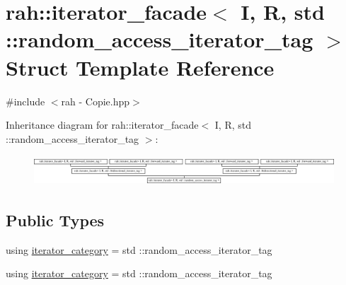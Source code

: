 \hypertarget{structrah_1_1iterator__facade_3_01_i_00_01_r_00_01std_01_1_1random__access__iterator__tag_01_4}{}\section{rah\+::iterator\+\_\+facade$<$ I, R, std \+::random\+\_\+access\+\_\+iterator\+\_\+tag $>$ Struct Template Reference}
\label{structrah_1_1iterator__facade_3_01_i_00_01_r_00_01std_01_1_1random__access__iterator__tag_01_4}


{\ttfamily \#include $<$rah -\/ Copie.\+hpp$>$}

Inheritance diagram for rah\+::iterator\+\_\+facade$<$ I, R, std \+::random\+\_\+access\+\_\+iterator\+\_\+tag $>$\+:\begin{figure}[H]
\begin{center}
\leavevmode
\includegraphics[height=1.132076cm]{structrah_1_1iterator__facade_3_01_i_00_01_r_00_01std_01_1_1random__access__iterator__tag_01_4}
\end{center}
\end{figure}
\subsection*{Public Types}
\begin{DoxyCompactItemize}
\item 
using \mbox{\hyperlink{structrah_1_1iterator__facade_3_01_i_00_01_r_00_01std_01_1_1random__access__iterator__tag_01_4_a7f2ab6cdf1c5182648b0210f431e3930}{iterator\+\_\+category}} = std \+::random\+\_\+access\+\_\+iterator\+\_\+tag
\item 
using \mbox{\hyperlink{structrah_1_1iterator__facade_3_01_i_00_01_r_00_01std_01_1_1random__access__iterator__tag_01_4_a7f2ab6cdf1c5182648b0210f431e3930}{iterator\+\_\+category}} = std \+::random\+\_\+access\+\_\+iterator\+\_\+tag
\end{DoxyCompactItemize}
